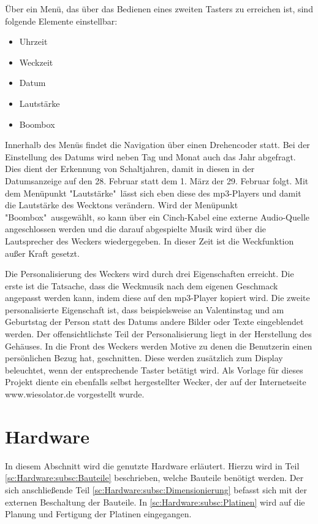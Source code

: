 \documentclass[journal, a4paper]{IEEEtran}
\begin{document}
	Über ein Menü, das über das Bedienen eines zweiten Tasters zu erreichen ist, sind folgende Elemente einstellbar:
	\begin{itemize}[leftmargin=20mm]
	\item Uhrzeit
	\item Weckzeit
	\item Datum
	\item Lautstärke
	\item Boombox
	\end{itemize}
	Innerhalb des Menüs findet die Navigation über einen Drehencoder statt.	Bei der Einstellung des Datums wird neben Tag und Monat auch das Jahr abgefragt. Dies dient der Erkennung von Schaltjahren, damit in diesen in der Datumsanzeige auf den 28. Februar statt dem 1. März der 29. Februar folgt. Mit dem Menüpunkt "Lautstärke"\ lässt sich eben diese des mp3-Players und damit die Lautstärke des Wecktons verändern. Wird der Menüpunkt "Boombox"\ ausgewählt, so kann über ein Cinch-Kabel eine externe Audio-Quelle angeschlossen werden und die darauf abgespielte Musik wird über die Lautsprecher des Weckers wiedergegeben. In dieser Zeit ist die Weckfunktion außer Kraft gesetzt.\par
	Die Personalisierung des Weckers wird durch drei Eigenschaften erreicht. Die erste ist die Tatsache, dass die Weckmusik nach dem eigenen Geschmack angepasst werden kann, indem diese auf den mp3-Player kopiert wird. Die zweite personalisierte Eigenschaft ist, dass beispielsweise an Valentinstag und am Geburtstag der Person statt des Datums andere Bilder oder Texte eingeblendet werden. Der offensichtlichste Teil der Personalisierung liegt in der Herstellung des Gehäuses. In die Front des Weckers werden Motive zu denen die Benutzerin einen persönlichen Bezug hat, geschnitten. Diese werden zusätzlich zum Display beleuchtet, wenn der entsprechende Taster betätigt wird.
	Als Vorlage für dieses Projekt diente ein ebenfalls selbst hergestellter Wecker, der auf der Internetseite www.wiesolator.de vorgestellt wurde.\par
	
\section{Hardware}
	In diesem Abschnitt wird die genutzte Hardware erläutert. Hierzu wird in Teil \ref{sc:Hardware:subsc:Bauteile} beschrieben, welche Bauteile benötigt werden. Der sich anschließende Teil \ref{sc:Hardware:subsc:Dimensionierung} befasst sich mit der externen Beschaltung der Bauteile. In \ref{sc:Hardware:subsc:Platinen} wird auf die Planung und Fertigung der Platinen eingegangen.
\end{document}

